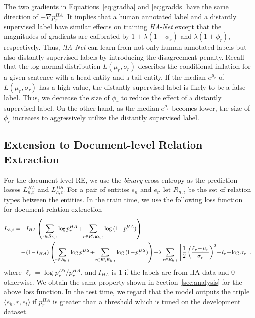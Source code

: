 \documentclass[11pt]{article}
\newcommand{\triple}[3]{\ensuremath{\langle #1,#2,#3\rangle}}
\newcommand{\hanet}{\emph{HA-Net}\xspace}
\newcommand{\lognormal}[2]{{L}(#1, #2)}
\newcommand{\head}{$e_{h}$\xspace}
\newcommand{\tail}{$e_{t}$\xspace}
\newcommand{\ehead}{e_{h}}
\newcommand{\etail}{e_{t}}
\newcommand{\fracsmall}[2]{#1/#2}
\newcommand{\minusmid}{\!-\!}
\newcommand{\plusmid}{\!+\!}
\begin{document}
The two gradients in Equations~\eqref{eq:gradha} and \eqref{eq:gradds} have the same direction of $-\nabla p_r^{HA}$.
It implies that a human annotated label and a distantly supervised label have similar effects on training \hanet
except that the magnitudes of gradients are calibrated by $1\plusmid\lambda(1 \plusmid \phi_r)$ and $\lambda(1 \plusmid \phi_r)$, respectively.
Thus, \hanet can learn from not only  human annotated labels but also distantly supervised labels by introducing the disagreement penalty.
Recall that the log-normal distribution $\lognormal{\mu_r}{\sigma_r}$ describes the conditional inflation for a given sentence with a head entity and a tail entity.
If the median $e^{\mu_r}$ of $\lognormal{\mu_r}{\sigma_r}$ has a high value, the distantly supervised label is likely to be a false label. 
Thus, we decrease the size of $\phi_r$ to reduce the effect of a distantly supervised label.
On the other hand, as the median $e^{\mu_r}$ becomes lower, the size of $\phi_r$ increases to aggressively utilize the distantly supervised label.











\subsection{Extension to Document-level Relation Extraction}
For the document-level RE, we use the \emph{binary} cross entropy as the prediction losses $L_{h,t}^{HA}$ and $L_{h,t}^{DS}$.
For a pair of entities \head and \tail, let $R_{h,t}$ be the set of relation types between the entities.
In the train time, we use the following loss function for document relation extraction
\vspace{-0.1in}
\begin{equation*}
\begin{aligned}
L_{h, t} =
&\minusmid I_{HA} \left(\sum_{r \in R_{h,t}}{\log{p^{HA}_{r}}} \plusmid \sum_{r \in R \setminus R_{h,t}}{\log{(1 \minusmid p^{HA}_{r})}} \right)\\
&\minusmid (1 \minusmid I_{HA})\left(\sum_{r \in R_{h,t}}{\log{p^{DS}_{r}}} \plusmid \sum_{r \in R \setminus R_{h,t}}{\log{(1\minusmid p^{DS}_{r})}} \right)
\plusmid \lambda \sum_{r \in R_{h,t}}{\left[\frac{1}{2}\left(\frac{\ell_r \minusmid \mu_r}{\sigma_r}\right)^2 \plusmid \ell_r \plusmid \log{\sigma_r}\right]}.
\end{aligned}
\vspace{-0.02in}
\end{equation*}
where  $\ell_r=\log{\fracsmall{p^{DS}_{r}}{p^{HA}_{r}}}$, and $I_{HA}$ is 1 if the labels are from HA data and 0 otherwise.
We obtain the same property shown in Section~\ref{sec:analysis} for the above loss function.
In the test time, we regard that the model outputs the triple $\triple{\ehead}{r}{\etail}$ if $p^{HA}_r$ is greater than a threshold which is tuned on the development dataset. 
 
\end{document}
